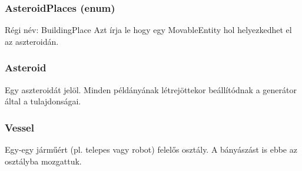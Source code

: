 \documentclass[../../projlab]{subfiles}
\begin{document}
\subsubsection{AsteroidPlaces (enum)}
\begin{class-template-responsibility}
    Régi név: BuildingPlace
    Azt írja le hogy egy MovableEntity hol helyezkedhet el az aszteroidán.
\end{class-template-responsibility}
\begin{class-template-attribute}
\end{class-template-attribute}

\subsubsection{Asteroid}
\begin{class-template-responsibility}
    Egy aszteroidát jelöl. Minden példányának létrejöttekor beállítódnak a generátor által a tulajdonságai.
\end{class-template-responsibility}
\begin{class-template-attribute}
\end{class-template-attribute}
\begin{class-template-method}
\end{class-template-method}



\subsubsection{Vessel}
\begin{class-template-responsibility}
    Egy-egy járműért (pl. telepes vagy robot) felelős osztály. 
    A bányászást is ebbe az osztályba mozgattuk.
\end{class-template-responsibility}
\begin{class-template-method}
\end{class-template-method}
\end{document}
